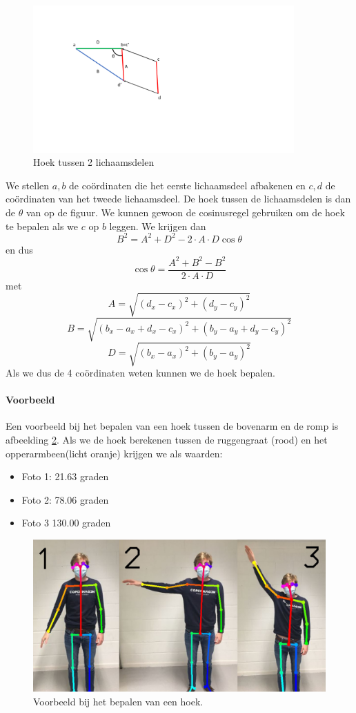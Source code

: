 \documentclass[a4paper,twoside,kulak]{kulakreport}
\begin{document}
\begin{figure}[H]
	\begin{center}
		\includegraphics[width=10cm]{cos.pdf}
	\end{center}
	\caption{Hoek tussen 2 lichaamsdelen}
	\label{cos}
\end{figure}

We stellen \(a, b\) de coördinaten die het eerste lichaamsdeel afbakenen en \(c, d\) de coördinaten van het tweede lichaamsdeel. De hoek tussen de lichaamsdelen is dan de \(\theta\) van op de figuur. We kunnen gewoon de cosinusregel gebruiken om de hoek te bepalen als we \(c\) op \(b\) leggen. We krijgen dan
\[B^2 = A^2 + D^2 -2\cdot A\cdot D\cos\theta\]
en dus
\[\cos\theta = \frac{A^2 + B^2 - B^2}{2\cdot A\cdot D}\]
met
\[A = \sqrt{(d_x - c_x)^2 + (d_y - c_y)^2}\]
\[B = \sqrt{(b_x - a_x + d_x - c_x)^2 + (b_y - a_y + d_y - c_y)^2}\]
\[D = \sqrt{(b_x - a_x)^2 + (b_y - a_y)^2}\]
Als we dus de 4 coördinaten weten kunnen we de hoek bepalen.
\paragraph{Voorbeeld}
Een voorbeeld bij het bepalen van een hoek tussen de bovenarm en de romp is afbeelding \ref{samen}. Als we de hoek berekenen tussen de ruggengraat (rood) en het opperarmbeen(licht oranje) krijgen we als waarden:
\begin{itemize}
	\item Foto 1: 21.63 graden
	\item Foto 2: 78.06 graden
	\item Foto 3 130.00 graden
\end{itemize}
\begin{figure}
	\begin{center}
		\includegraphics[width=12cm]{samen.jpg}
	\end{center}
	\caption{Voorbeeld bij het bepalen van een hoek.}
	\label{samen}
\end{figure}
\end{document}
